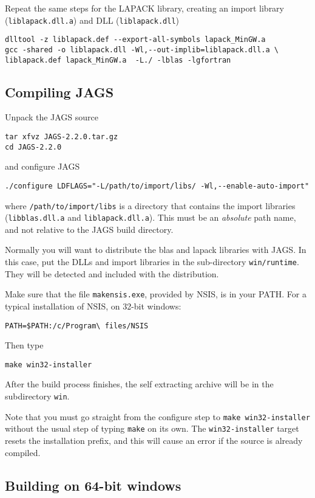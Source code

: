 \documentclass[11pt, a4paper, titlepage]{article}
\newcommand{\JAGS}{\textsf{JAGS}}
\begin{document}
Repeat the same steps for the LAPACK library, creating an import library
(\verb+liblapack.dll.a+) and DLL (\verb+liblapack.dll+)
\begin{verbatim}
dlltool -z liblapack.def --export-all-symbols lapack_MinGW.a
gcc -shared -o liblapack.dll -Wl,--out-implib=liblapack.dll.a \
liblapack.def lapack_MinGW.a  -L./ -lblas -lgfortran
\end{verbatim}

\subsection{Compiling \JAGS}

Unpack the JAGS source
\begin{verbatim}
tar xfvz JAGS-2.2.0.tar.gz
cd JAGS-2.2.0
\end{verbatim}
and configure JAGS
\begin{verbatim}
./configure LDFLAGS="-L/path/to/import/libs/ -Wl,--enable-auto-import" 
\end{verbatim}
where \verb+/path/to/import/libs+ is a directory that contains the
import libraries (\verb+libblas.dll.a+ and \verb+liblapack.dll.a+).
This must be an {\em absolute} path name, and not relative to
the JAGS build directory.

Normally you will want to distribute the blas and lapack libraries
with JAGS.  In this case, put the DLLs and import libraries in the
sub-directory \verb+win/runtime+. They will be detected and included
with the distribution.

Make sure that the file \verb+makensis.exe+, provided by NSIS, is in
your PATH. For a typical installation of NSIS, on 32-bit windows:
\begin{verbatim}
PATH=$PATH:/c/Program\ files/NSIS
\end{verbatim}
Then type
\begin{verbatim}
make win32-installer
\end{verbatim}
After the build process finishes, the self extracting archive will be
in the subdirectory \verb+win+.

Note that you must go straight from the configure step to \texttt{make
  win32-installer} without the usual step of typing \texttt{make} on
its own.  The \texttt{win32-installer} target resets the installation
prefix, and this will cause an error if the source is already
compiled.

\subsection{Building on 64-bit windows}
\end{document}
